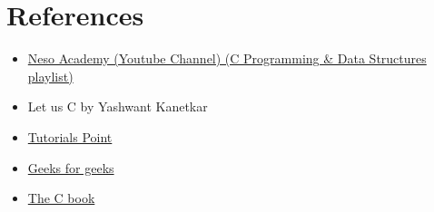 \documentclass[12pt, a4paper]{article}
\begin{document}
    \section{References}

	\begin{itemize} 
        \item \href{https://youtube.com/playlist?list=PLBlnK6fEyqRhX6r2uhhlubuF5QextdCSM}{Neso Academy (Youtube Channel) (C Programming \& Data Structures playlist)}
        \item Let us C by Yashwant Kanetkar    
        \item \href{https://www.tutorialspoint.com/cprogramming/index.htm}{Tutorials Point}
        \item \href{https://www.geeksforgeeks.org/c-programming-language/}{Geeks for geeks}
        \item \href{https://publications.gbdirect.co.uk/c_book/}{The C book}
	\end{itemize}
	
\end{document}
